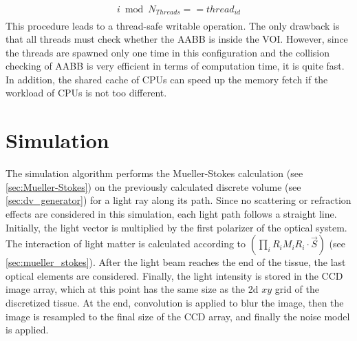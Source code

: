 %
\begin{align}
\begin{split}
    i \bmod N_{\mathit{Threads}} == \mathit{thread}_{\mathit{id}}
\end{split}
\end{align}
%
This procedure leads to a thread-safe writable operation.
The only drawback is that all threads must check whether the \ac{AABB} is inside the \ac{VOI}.
However, since the threads are spawned only one time in this configuration and the collision checking of \ac{AABB} is very efficient in terms of computation time, it is quite fast.
In addition, the shared cache of \acp{CPU} can speed up the memory fetch if the workload of \acp{CPU} is not too different.
% 
%
%
%
\section{Simulation}
\label{sec:simulation}
%
The simulation algorithm performs the Mueller-Stokes calculation (see \cref{sec:Mueller-Stokes}) on the previously calculated discrete volume (see \cref{sec:dv_generator}) for a light ray along its path.
Since no scattering or refraction effects are considered in this simulation, each light path follows a straight line.
Initially, the light vector is multiplied by the first polarizer of the optical system.
The interaction of light matter is calculated according to $\left( \prod_i R_i M_i R_i \cdot \vec{S} \right)$ (see \cref{sec:mueller_stokes}).
After the light beam reaches the end of the tissue, the last optical elements are considered.
Finally, the light intensity is stored in the \acs{CCD} image array, which at this point has the same size as the 2d $xy$ grid of the discretized tissue.
At the end, convolution is applied to blur the image, then the image is resampled to the final size of the \ac{CCD} array, and finally the noise model is applied.
%
%
